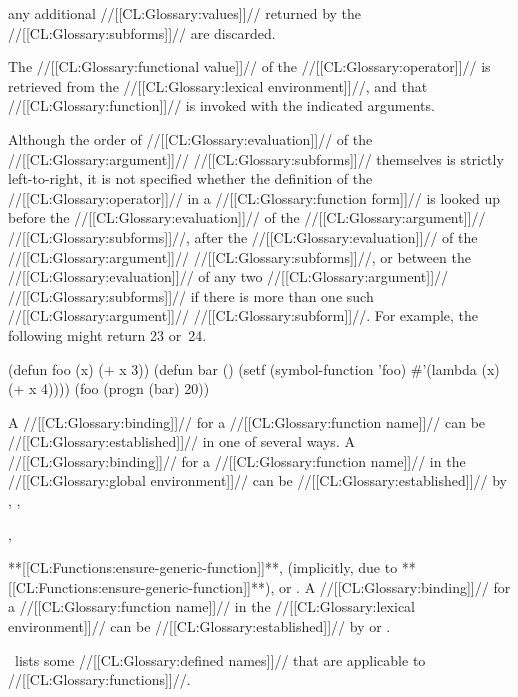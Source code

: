any additional //[[CL:Glossary:values]]// returned by the //[[CL:Glossary:subforms]]// are discarded.

The //[[CL:Glossary:functional value]]// of the //[[CL:Glossary:operator]]//  is retrieved from the //[[CL:Glossary:lexical environment]]//, and that //[[CL:Glossary:function]]// is invoked with the indicated arguments.

 Although the order of //[[CL:Glossary:evaluation]]// of  the //[[CL:Glossary:argument]]// //[[CL:Glossary:subforms]]// themselves is  strictly left-to-right, it is not specified whether  the definition of the //[[CL:Glossary:operator]]// in a //[[CL:Glossary:function form]]// is looked up  before the //[[CL:Glossary:evaluation]]// of the //[[CL:Glossary:argument]]// //[[CL:Glossary:subforms]]//, after the //[[CL:Glossary:evaluation]]// of the //[[CL:Glossary:argument]]// //[[CL:Glossary:subforms]]//, or between the //[[CL:Glossary:evaluation]]// of any two //[[CL:Glossary:argument]]// //[[CL:Glossary:subforms]]//  if there is more than one such //[[CL:Glossary:argument]]// //[[CL:Glossary:subform]]//.   For example, the following might return 23 or~24.

\code
 (defun foo (x) (+ x 3))
 (defun bar () (setf (symbol-function 'foo) #'(lambda (x) (+ x 4))))
 (foo (progn (bar) 20)) \endcode

A //[[CL:Glossary:binding]]// for a //[[CL:Glossary:function name]]// can be //[[CL:Glossary:established]]// in  one of several ways.  A //[[CL:Glossary:binding]]// for a //[[CL:Glossary:function name]]// in  the //[[CL:Glossary:global environment]]// can be //[[CL:Glossary:established]]// by 
 ,
 ,

 ,

 **[[CL:Functions:ensure-generic-function]]**,
  (implicitly, due to **[[CL:Functions:ensure-generic-function]]**), or
 . A //[[CL:Glossary:binding]]// for a //[[CL:Glossary:function name]]// in the //[[CL:Glossary:lexical environment]]// can be //[[CL:Glossary:established]]// by
    or . 


\Thenextfigure\ lists some //[[CL:Glossary:defined names]]// that are applicable to //[[CL:Glossary:functions]]//.

  

